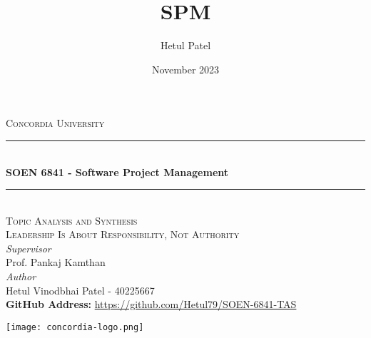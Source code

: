 \documentclass[a4paper, 11pt]{report}
\title{SPM}
\author{Hetul Patel}
\date{November 2023}
\begin{document}
\begin{titlepage} %
	\newcommand{\HRule}{\rule{\linewidth}{0.5mm}} %
	
	\center %
	
	
	\textsc{\LARGE Concordia University}\\[1.5cm] %
	

	
	\HRule\\[0.4cm]
	
	{\huge\bfseries  SOEN 6841 - Software Project Management}\\[0.4cm] %
	
	\HRule\\[1.5cm]
	\textsc{\Large Topic Analysis and Synthesis}\\[0.5cm] %
	\textsc{\Large Leadership Is About Responsibility, Not Authority}\\[0.5cm]
	
			\large
			\textit{Supervisor}\\
			Prof. Pankaj Kamthan\\[0.5cm] %
    \vfill
    \large
			\textit{Author}\\
            Hetul Vinodbhai Patel - \textsc{40225667}\\
            
	
	\vfill\vfill\vfill\vfill%
	\textbf{GitHub Address:} \url{https://github.com/Hetul79/SOEN-6841-TAS}

	
 	\vfill\vfill
 	\texttt{[image: concordia-logo.png]}\\[1cm] %
	 
	
	\vfill %
	
\end{titlepage}
\end{document}
